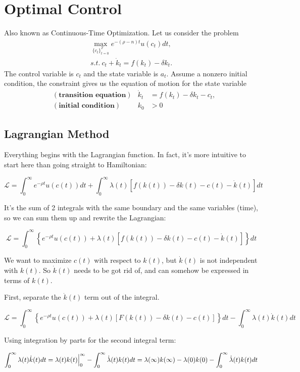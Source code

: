 \documentclass[11pt,a4paper]{book}
\theoremstyle{definition}\newtheorem{definition}{Definition}
\theoremstyle{definition}\newtheorem{fact}{Fact}
\theoremstyle{definition}\newtheorem{remark}{Remark}
\theoremstyle{definition}\newtheorem{ex}{Ex.}
\theoremstyle{definition}\newtheorem{project}{Project}
\theoremstyle{definition}\newtheorem{problem}{Problem}
\theoremstyle{definition}\newtheorem{example}{Example}
\numberwithin{theorem}{section}
\numberwithin{corollary}{chapter}
\numberwithin{assumption}{chapter}
\numberwithin{definition}{chapter}
\numberwithin{prop}{chapter}
\numberwithin{notation}{chapter}
\numberwithin{problem}{chapter}
\numberwithin{example}{chapter}
\numberwithin{fact}{chapter}
\numberwithin{ex}{chapter}
\begin{document}
	
	\section{Optimal Control}
	Also known as Continuous-Time Optimization. Let us consider the problem
	\begin{align}
		\max_{ \{c_t\}^T_{t=0} } e^{-(\rho-n) t} u(c_t)  dt, \\
		s.t. \ c_t + \dot{k}_t = f(k_t) - \delta k_t.
	\end{align}
	The control variable is $c_t$ and the state variable is $a_t$. Assume a nonzero initial condition, the constraint gives us the equation of motion for the state variable
	\begin{align*}
		&(\textbf{transition equation}) & \dot{k}_t &= f(k_t) - \delta k_t - c_t, \\
		&(\textbf{initial condition}) & k_0 &> 0
	\end{align*}

	
	\subsection{Lagrangian Method}
	Everything begins with the Lagrangian function. In fact, it's more intuitive to start here than going straight to Hamiltonian:

$$
    \mathcal{L} = \int_{0}^{\infty} e^{-\rho t} u(c(t)) dt + \int_{0}^{\infty} \lambda(t) \left[ f( k(t)) - \delta k(t) - c(t) - \dot{k}(t) \right] dt
$$

It's the sum of 2 integrals with the same boundary and the same variables (time), so we can sum them up and rewrite the Lagrangian:

$$
    \mathcal{L} = \int_{0}^{\infty} \left\{ e^{-\rho t} u(c(t)) + \lambda(t) \left[ f( k(t)) - \delta k(t) - c(t) - \dot{k}(t) \right] \right\} dt
$$

We want to maximize $c(t)$ with respect to $k(t)$, but $\dot{k}(t)$ is not independent with $k(t)$. So $\dot{k}(t)$ needs to be got rid of, and can somehow be expressed in terms of $k(t)$.

First, separate the $\dot{k}(t)$ term out of the integral.

$$
    \mathcal{L} = \int_{0}^{\infty} \left\{ e^{-\rho t} u(c(t)) + \lambda(t) \left[ F( k(t)) - \delta k(t) - c(t)  \right] \right\} dt - \int_{0}^{\infty} \lambda(t)\dot{k}(t)dt
$$

Using integration by parts  for the second integral term:

$$
     \int_{0}^{\infty} \lambda(t) \dot{k}(t) dt                                               \\
     = \lambda(t) k(t) \Big|_0^\infty - \int_{0}^{\infty} \dot{\lambda}(t)k(t)dt              \\
     = \lambda(\infty) k(\infty) - \lambda(0) k(0) - \int_{0}^{\infty} \dot{\lambda}(t)k(t)dt 
$$
\end{document}
